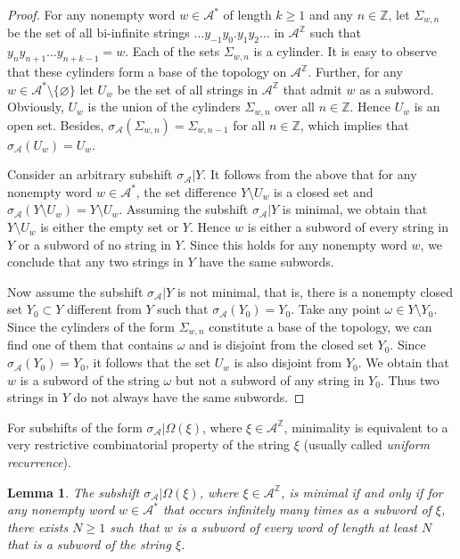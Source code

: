 \documentclass[12pt]{article}
\newtheorem{lemma}[theorem]{Lemma}
\theoremstyle{definition}
\def\bZ{\mathbb{Z}}
\def\cA{\mathcal{A}}
\def\om{\omega}
\def\si{\sigma}
\def\Om{\Omega}
\begin{document}
\begin{proof}
For any nonempty word $w\in\cA^*$ of length $k\ge1$ and any 
$n\in\bZ$, let $\Sigma_{w,n}$ be the set of all bi-infinite strings $\ldots 
y_{-1}y_0.y_1y_2\ldots$ in $\cA^{\bZ}$ such that $y_ny_{n+1}\ldots 
y_{n+k-1}=w$.  Each of the sets $\Sigma_{w,n}$ is a cylinder.  It is easy 
to observe that these cylinders form a base of the topology on 
$\cA^{\bZ}$.  Further, for any $w\in\cA^*\setminus\{\varnothing\}$ let 
$U_w$ be the set of all strings in $\cA^{\bZ}$ that admit $w$ as a 
subword.  Obviously, $U_w$ is the union of the cylinders $\Sigma_{w,n}$ 
over all $n\in\bZ$.  Hence $U_w$ is an open set.  Besides, 
$\si_{\cA}(\Sigma_{w,n})=\Sigma_{w,n-1}$ for all $n\in\bZ$, which implies 
that $\si_{\cA}(U_w)=U_w$.

Consider an arbitrary subshift $\si_{\cA}|Y$.  It follows from the above 
that for any nonempty word $w\in\cA^*$, the set difference $Y\setminus U_w$ 
is a closed set and $\si_{\cA}(Y\setminus U_w)=Y\setminus U_w$.  Assuming 
the subshift $\si_{\cA}|Y$ is minimal, we obtain that $Y\setminus U_w$ is 
either the empty set or $Y$.  Hence $w$ is either a subword of every string 
in $Y$ or a subword of no string in $Y$.  Since this holds for any nonempty 
word $w$, we conclude that any two strings in $Y$ have the same subwords.

Now assume the subshift $\si_{\cA}|Y$ is not minimal, that is, there is a 
nonempty closed set $Y_0\subset Y$ different from $Y$ such that 
$\si_{\cA}(Y_0)=Y_0$.  Take any point $\om\in Y\setminus Y_0$.  Since the 
cylinders of the form $\Sigma_{w,n}$ constitute a base of the topology, we 
can find one of them that contains $\om$ and is disjoint from the closed 
set $Y_0$.  Since $\si_{\cA}(Y_0)=Y_0$, it follows that the set $U_w$ is 
also disjoint from $Y_0$.  We obtain that $w$ is a subword of the string 
$\om$ but not a subword of any string in $Y_0$.  Thus two strings in $Y$ do 
not always have the same subwords.
\end{proof}

For subshifts of the form $\si_{\cA}|\Om(\xi)$, where $\xi\in\cA^{\bZ}$, 
minimality is equivalent to a very restrictive combinatorial property of 
the string $\xi$ (usually called \emph{uniform recurrence}).

\begin{lemma}\label{subwords-in-subwords}
The subshift $\si_{\cA}|\Om(\xi)$, where $\xi\in\cA^{\bZ}$, is minimal if 
and only if for any nonempty word $w\in\cA^*$ that occurs infinitely many 
times as a subword of $\xi$, there exists $N\ge1$ such that $w$ is a 
subword of every word of length at least $N$ that is a subword of the 
string $\xi$.
\end{lemma}
\end{document}
